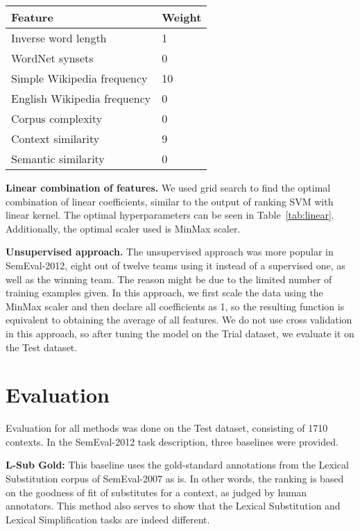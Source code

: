 \documentclass[10pt, a4paper]{article}
\begin{document}
\begin{table*}
\caption{Optimal hyperparameters for linear combination of features.}
\label{tab:linear}
\begin{center}
\begin{tabular}{ll}
\toprule
Feature & Weight \\
\midrule
Inverse word length & 1 \\
WordNet synsets & 0 \\
Simple Wikipedia frequency & 10 \\
English Wikipedia frequency & 0 \\
Corpus complexity & 0 \\
Context similarity & 9 \\
Semantic similarity & 0 \\
\bottomrule
\end{tabular}
\end{center}
\end{table*}

\textbf{Linear combination of features.} We used grid search to find the optimal combination of linear coefficients, similar to the output of ranking SVM with linear kernel. The optimal hyperparameters can be seen in Table~\ref{tab:linear}. Additionally, the optimal scaler used is MinMax scaler.

\textbf{Unsupervised approach.} The unsupervised approach was more popular in SemEval-2012, eight out of twelve teams using it instead of a supervised one, as well as the winning team. The reason might be due to the limited number of training examples given. In this approach, we first scale the data using the MinMax scaler and then declare all coefficients as 1, so the resulting function is equivalent to obtaining the average of all features. We do not use cross validation in this approach, so after tuning the model on the Trial dataset, we evaluate it on the Test dataset.

\section{Evaluation}
Evaluation for all methods was done on the Test dataset, consisting of 1710 contexts. In the SemEval-2012 task description, three baselines were provided.

\textbf{L-Sub Gold:} This baseline uses the gold-standard annotations from the Lexical Substitution corpus of SemEval-2007 as is. In other words, the ranking is based on the goodness of fit of substitutes for a context, as judged by human annotators. This method also serves to show that the Lexical Substitution and Lexical Simplification tasks are indeed different.
\end{document}
